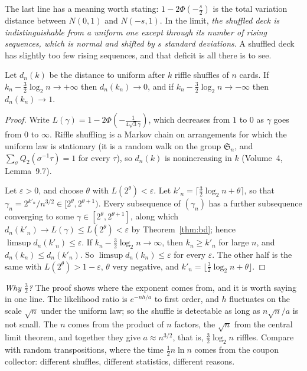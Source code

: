 The last line has a meaning worth stating: $1-2\Phi(-\frac s2)$ is the total variation distance between $N(0,1)$ and $N(-s,1)$. In the limit, \emph{the shuffled
deck is indistinguishable from a uniform one except through its number of rising sequences, which is normal and shifted by $s$ standard
deviations}. A shuffled deck has slightly too few rising sequences, and that deficit is all there is to see.

\begin{corollary}\label{cor:riffle}
Let $d_n(k)$ be the distance to uniform after $k$ riffle shuffles of $n$ cards. If $k_n-\frac32\log_2n\to+\infty$ then $d_n(k_n)\to0$, and if $k_n-\frac32\log_2n\to-\infty$ then $d_n(k_n)\to1$.
\end{corollary}

\begin{proof}
Write $L(\gamma)=1-2\Phi(-\frac1{4\sqrt3\gamma})$, which decreases from $1$ to $0$ as $\gamma$ goes from $0$ to $\infty$. Riffle shuffling is a Markov chain on arrangements for
which the uniform law is stationary (it is a random walk on the group $\mathfrak S_n$, and $\sum_\sigma Q_2(\sigma^{-1}\tau)=1$ for every $\tau$), so $d_n(k)$ is
nonincreasing in $k$ (Volume~4, Lemma~9.7).

Let $\varepsilon>0$, and choose $\theta$ with $L(2^\theta)<\varepsilon$. Let $k'_n=\lceil\frac32\log_2n+\theta\rceil$, so that $\gamma_n=2^{k'_n}/n^{3/2}\in[2^\theta,2^{\theta+1})$. Every subsequence of $(\gamma_n)$ has a further
subsequence converging to some $\gamma\in[2^\theta,2^{\theta+1}]$, along which $d_n(k'_n)\to L(\gamma)\le L(2^\theta)<\varepsilon$ by Theorem~\ref{thm:bd}; hence $\limsup d_n(k'_n)\le\varepsilon$. If $k_n-\frac32\log_2n\to\infty$,
then $k_n\ge k'_n$ for large $n$, and $d_n(k_n)\le d_n(k'_n)$. So $\limsup d_n(k_n)\le\varepsilon$ for every $\varepsilon$. The other half is the same with $L(2^\theta)>1-\varepsilon$, $\theta$ very negative, and $k'_n=\lfloor\frac32\log_2n+\theta\rfloor$.
\end{proof}

\emph{Why $\frac32$?} The proof shows where the exponent comes from, and it is worth saying in one line. The likelihood ratio is $e^{-nh/a}$ to first order, and $h$ fluctuates
on the scale $\sqrt n$ under the uniform law; so the shuffle is detectable as long as $n\sqrt n/a$ is not small. The $n$ comes from the product of $n$ factors, the $\sqrt n$ from
the central limit theorem, and together they give $a\approx n^{3/2}$, that is, $\frac32\log_2n$ riffles. Compare with random transpositions, where the time
$\frac12n\ln n$ comes from the coupon collector: different shuffles, different statistics, different reasons.

